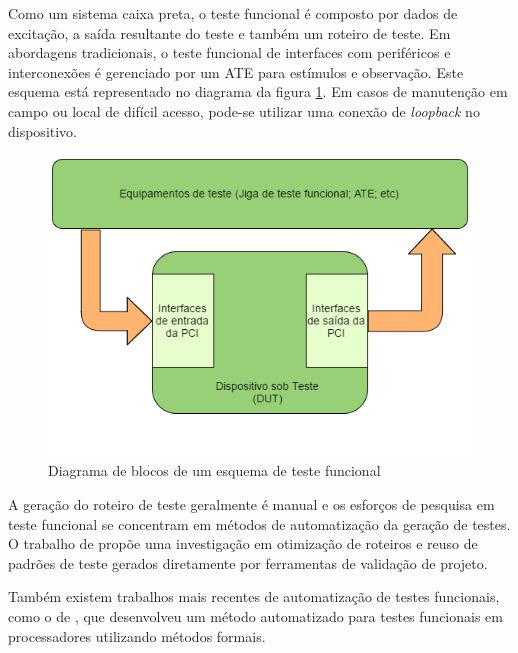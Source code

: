 Como um sistema caixa preta, o teste funcional é composto por dados de excitação, a saída resultante do teste e também um roteiro de teste. Em abordagens tradicionais, o teste funcional de interfaces com periféricos e interconexões é gerenciado por um ATE para estímulos e observação. Este esquema está representado no diagrama da figura \ref{fig:funcblock}. Em casos de manutenção em campo ou local de difícil acesso, pode-se utilizar uma conexão de \textit{loopback} no dispositivo.

\begin{figure}[h!]
    \centering
        \includegraphics[width=0.8\linewidth]{fig/functionaltest}
            \caption{Diagrama de blocos de um esquema de teste funcional}
            \label{fig:funcblock}
\end{figure}

A geração do roteiro de teste geralmente é manual e os esforços de pesquisa em teste funcional se concentram em métodos de automatização da geração de testes. O trabalho de \citet{thibeault2006} propõe uma investigação em otimização de roteiros e reuso de padrões de teste gerados diretamente por ferramentas de validação de projeto. 

Também existem trabalhos mais recentes de automatização de testes funcionais, como o de \citet{riefert2014effective}, que desenvolveu um método automatizado para testes funcionais em processadores utilizando métodos formais.




